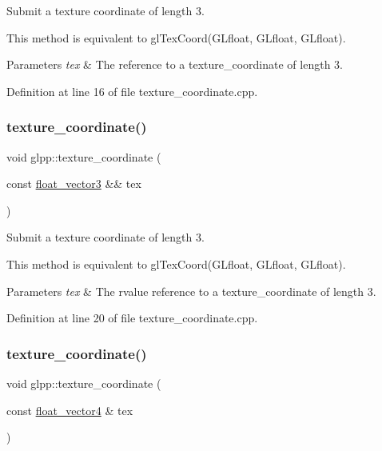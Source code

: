 Submit a texture coordinate of length 3. 

This method is equivalent to gl\+Tex\+Coord(\+G\+Lfloat, G\+Lfloat, G\+Lfloat).


\begin{DoxyParams}{Parameters}
{\em tex} & The reference to a texture\+\_\+coordinate of length 3. \\
\hline
\end{DoxyParams}


Definition at line 16 of file texture\+\_\+coordinate.\+cpp.

\mbox{\label{namespaceglpp_a4a42134248c8e5bba26f7edebc610649}} 
\subsubsection{\texorpdfstring{texture\+\_\+coordinate()}{texture\_coordinate()}\hspace{0.1cm}{\footnotesize\ttfamily [4/8]}}
{\footnotesize\ttfamily void glpp\+::texture\+\_\+coordinate (\begin{DoxyParamCaption}\item[{const \hyperlink{namespaceglpp_a3fa7b207a8b7dba583fb22731a616d73}{float\+\_\+vector3} \&\&}]{tex }\end{DoxyParamCaption})\hspace{0.3cm}{\ttfamily [noexcept]}}



Submit a texture coordinate of length 3. 

This method is equivalent to gl\+Tex\+Coord(\+G\+Lfloat, G\+Lfloat, G\+Lfloat).


\begin{DoxyParams}{Parameters}
{\em tex} & The rvalue reference to a texture\+\_\+coordinate of length 3. \\
\hline
\end{DoxyParams}


Definition at line 20 of file texture\+\_\+coordinate.\+cpp.

\mbox{\label{namespaceglpp_aba5392bc48fea13c11e7e33251a178df}} 
\subsubsection{\texorpdfstring{texture\+\_\+coordinate()}{texture\_coordinate()}\hspace{0.1cm}{\footnotesize\ttfamily [5/8]}}
{\footnotesize\ttfamily void glpp\+::texture\+\_\+coordinate (\begin{DoxyParamCaption}\item[{const \hyperlink{namespaceglpp_ab4a3d7b8ed8e2e4810006eef5213a460}{float\+\_\+vector4} \&}]{tex }\end{DoxyParamCaption})\hspace{0.3cm}{\ttfamily [noexcept]}}



